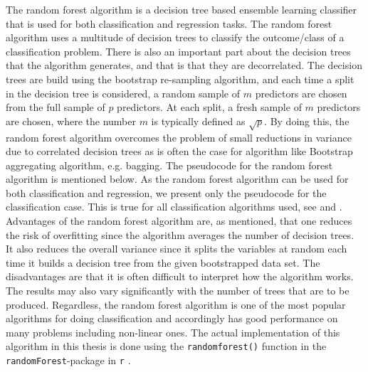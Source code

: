 \documentclass[../thesis.tex]{subfiles}
\begin{document}
\noindent The random forest algorithm \citep{ho1995random} is a decision tree based ensemble learning classifier that is used for both classification and regression tasks. The random forest algorithm uses a multitude of decision trees to classify the outcome/class of a classification problem. There is also an important part about the decision trees that the algorithm generates, and that is that they are decorrelated. The decision trees are build using the bootstrap re-sampling algorithm, and each time a split in the decision tree is considered, a random sample of $m$ predictors are chosen from the full sample of $p$ predictors. At each split, a fresh sample of $m$ predictors are chosen, where the number $m$ is typically defined as $\sqrt{p}$. By doing this, the random forest algorithm overcomes the problem of small reductions in variance due to correlated decision trees as is often the case for algorithm like Bootstrap aggregating algorithm, e.g. bagging. The pseudocode for the random forest algorithm is mentioned below. As the random forest algorithm can be used for both classification and regression, we present only the pseudocode for the classification case. This is true for all classification algorithms used, see \citep{friedman2009elements} and \citep{james2013introduction}.\\
\indent Advantages of the random forest algorithm are, as mentioned, that one reduces the risk of overfitting since the algorithm averages the number of decision trees. It also reduces the overall variance since it splits the variables at random each time it builds a decision tree from the given bootstrapped data set. The disadvantages are that it is often difficult to interpret how the algorithm works. The results may also vary significantly with the number of trees that are to be produced. Regardless, the random forest algorithm is one of the most popular algorithms for doing classification and accordingly has good performance on many problems including non-linear ones. The actual implementation of this algorithm in this thesis is done using the \texttt{randomforest()} function in the \texttt{randomForest}-package in \texttt{r} \citep{randomforest}.\\
\end{document}
